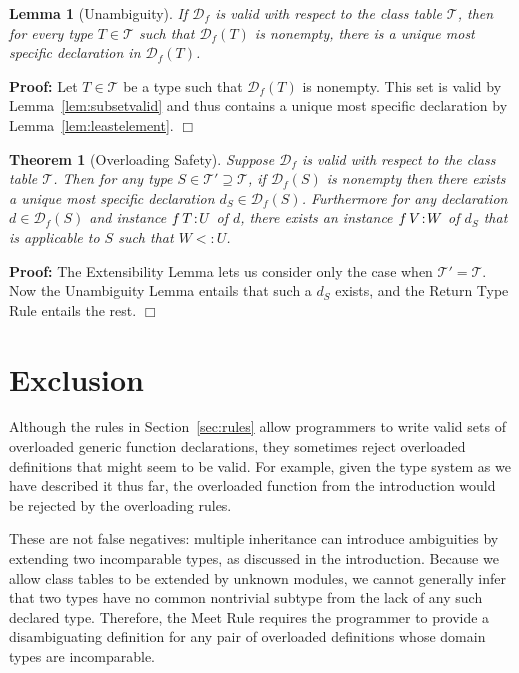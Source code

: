 \documentclass[10pt]{sigplanconf}
\newcommand{\subtypeof}{\ensuremath{<:}}
\newcommand{\decl}[3]{\mbox{\ensuremath{{#1}\,{#2}\!:\!{#3}}}}
\newcommand{\T}{\ensuremath{\mathcal{T}}}
\newcommand{\ctext}{\ensuremath{\supseteq}}
\newcommand{\D}{\ensuremath{\mathcal{D}}}
\newcommand{\Df}[1][f]{\D_{\!#1}}
\newtheorem{lemma}{Lemma}
\newtheorem{theorem}{Theorem}
\newenvironment{proof}{\noindent \textbf{Proof:} }{\hfill $\Box$}
\begin{document}
\begin{lemma}[Unambiguity]
If $\Df$ is valid with respect to the class table $\T$,
then for every type $T \in \T$ such that $\Df(T)$ is nonempty, there is a unique most specific declaration in $\Df(T)$.
\end{lemma}
\begin{proof}
Let $T \in \T$ be a type such that $\Df(T)$ is nonempty. This set is valid
by Lemma~\ref{lem:subsetvalid} and thus contains a unique most specific
declaration by Lemma~\ref{lem:leastelement}.
\end{proof}

\begin{theorem}[Overloading Safety]
\label{thm:safety}
Suppose $\Df$ is valid with respect to the class table $\T$.
Then for any type $S \in \T' \ctext \T$,
if $\Df(S)$ is nonempty then there exists a unique most specific declaration $d_{S} \in \Df(S)$.
Furthermore for any declaration $d \in \Df(S)$ and instance $\decl{f}{T}{U}$
of $d$, there exists an instance
$\decl{f}{V}{W}$ of $d_{S}$ that is applicable to $S$ such that $W \subtypeof U$.
\end{theorem}
\begin{proof}
The Extensibility Lemma lets us consider only the case when $\T' = \T$. 
Now the Unambiguity Lemma entails that such a $d_{S}$ exists, and the Return Type Rule
entails the rest.
\end{proof}


\section{Exclusion}
\label{sec:exclusion}

Although the rules in Section~\ref{sec:rules} 
allow programmers to write valid sets 
of overloaded generic function declarations,
they sometimes reject overloaded definitions 
that might seem to be valid.
For example, 
given the type system as we have described it thus far,
the overloaded  function from the introduction 
would be rejected by the overloading rules.

These are not false negatives:
multiple inheritance can introduce ambiguities 
by extending two incomparable types, 
as discussed in the introduction.
Because we allow class tables to be extended by unknown modules, 
we cannot generally infer that two types have no common nontrivial subtype 
from the lack of any such declared type.
Therefore, 
the Meet Rule requires the programmer 
to provide a disambiguating definition 
for any pair of overloaded definitions whose domain types are incomparable.
\end{document}
